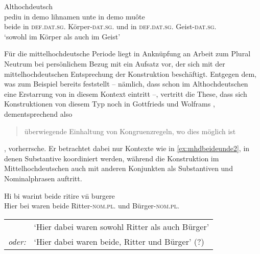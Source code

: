 \begin{exe}
\ex \label{ex:beideintiahd_3}
	\langinfo%
		{Althochdeutsch}
		{}
		{\cite[APB\_PredigtsammlungB, 1732--1739]{ddd}}\\
	\gll pediu in demo lihnamen unte in demo muôte \\
		beide in \textsc{def.dat.sg.\MascI} Körper-\textsc{dat.sg.\MascI} und in
			\textsc{def.dat.sg.\MascI} Geist-\textsc{dat.sg.\MascI} \\
	\trans `sowohl im Körper als auch im Geist'
\end{exe}

Für die mittelhochdeutsche Periode liegt in Anknüpfung an
 Arbeit zum Plural Neutrum bei persönlichem Bezug mit
\citet{askedal1974} ein Aufsatz vor, der sich mit der mittelhochdeutschen
Entsprechung der Konstruktion  beschäftigt. Entgegen
dem, was zum Beispiel bereits \citet[433--434]{behaghel1923} feststellt --
nämlich, dass schon im Althochdeutschen eine Erstarrung von  in
diesem Kontext eintritt --, vertritt \citeauthor{askedal1974} die These, dass
sich Konstruktionen von diesem Typ noch in Gottfrieds
\nocite{maroldschroeder1969} und Wolframs
\nocite{lachmannhartl1952} ,
dementsprechend also \blockcquote[37]{askedal1974}{überwiegende Einhaltung von
Kongruenzregeln, wo dies möglich ist}, vorherrsche. Er betrachtet dabei nur
Kontexte wie in \cref{ex:mhdbeideunde2}, in denen Substantive koordiniert
werden, während die Konstruktion im Mittelhochdeutschen auch mit anderen
Konjunkten als Substantiven und Nominalphrasen auftritt.

\begin{exe}
\ex\label{ex:mhdbeideunde2}
	\gll Hi bi warint beide ritire vn̄ burgere \\
		Hier bei waren beide Ritter-\textsc{nom.pl.\MascI} und
			Bürger-\textsc{nom.pl.\MascA} \\
	\trans %
		\begin{tabular}{@{} r @{~} l @{}}
				  & `Hier dabei waren sowohl Ritter als auch Bürger' \\
			\emph{oder:} & `Hier dabei waren beide, Ritter und Bürger' (?)
			\\
		\end{tabular}
		\parencites(Nr.~N~321, Rosheim, Dépt.~Bas-Rhin, 1286)[245,29]{cao5}
\end{exe}

